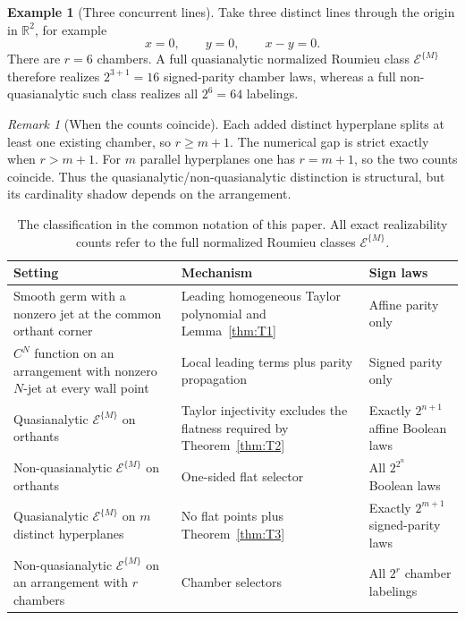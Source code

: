\documentclass[11pt]{article}
\theoremstyle{definition}
\newtheorem{example}[theorem]{Example}
\theoremstyle{remark}
\newtheorem{remark}[theorem]{Remark}
\newcommand{\R}{\mathbb{R}}
\begin{document}
\begin{example}[Three concurrent lines]
Take three distinct lines through the origin in $\R^2$, for example
\[
 x=0,\qquad y=0,\qquad x-y=0.
\]
There are $r=6$ chambers. A full quasianalytic normalized Roumieu class $\mathcal{E}^{\{M\}}$ therefore realizes $2^{3+1}=16$ signed-parity chamber laws, whereas a full non-quasianalytic such class realizes all $2^6=64$ labelings.
\end{example}

\begin{remark}[When the counts coincide]
Each added distinct hyperplane splits at least one existing chamber, so $r\ge m+1$. The numerical gap is strict exactly when $r>m+1$. For $m$ parallel hyperplanes one has $r=m+1$, so the two counts coincide. Thus the quasianalytic/non-quasianalytic distinction is structural, but its cardinality shadow depends on the arrangement.
\end{remark}

\begin{table}[t]
\centering
\caption{The classification in the common notation of this paper. All exact realizability counts refer to the full normalized Roumieu classes $\mathcal{E}^{\{M\}}$.}
\label{tab:summary}
\begin{tabularx}{\textwidth}{@{}>{\raggedright\arraybackslash}p{}X>{\raggedright\arraybackslash}p{}@{}}
\toprule
Setting & Mechanism & Sign laws \\
\midrule
Smooth germ with a nonzero jet at the common orthant corner & Leading homogeneous Taylor polynomial and Lemma~\ref{thm:T1} & Affine parity only \\
$C^N$ function on an arrangement with nonzero $N$-jet at every wall point & Local leading terms plus parity propagation & Signed parity only \\
Quasianalytic $\mathcal{E}^{\{M\}}$ on orthants & Taylor injectivity excludes the flatness required by Theorem~\ref{thm:T2} & Exactly $2^{n+1}$ affine Boolean laws \\
Non-quasianalytic $\mathcal{E}^{\{M\}}$ on orthants & One-sided flat selector & All $2^{2^n}$ Boolean laws \\
Quasianalytic $\mathcal{E}^{\{M\}}$ on $m$ distinct hyperplanes & No flat points plus Theorem~\ref{thm:T3} & Exactly $2^{m+1}$ signed-parity laws \\
Non-quasianalytic $\mathcal{E}^{\{M\}}$ on an arrangement with $r$ chambers & Chamber selectors & All $2^r$ chamber labelings \\
\bottomrule
\end{tabularx}
\end{table}
\end{document}
